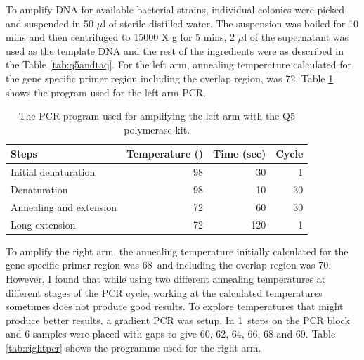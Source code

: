 		To amplify DNA for available bacterial strains, individual colonies were picked and suspended in 50 $ \mu $l of sterile distilled water. The suspension was boiled for 10 mins and then centrifuged to 15000 X g for 5 mins, 2 $ \mu $l of the supernatant was used as the template DNA and the rest of the ingredients were as described in the Table \ref{tab:q5andtaq}. For the left arm, annealing temperature calculated for the gene specific primer region including the overlap region, was 72\textcelsius. Table \ref{tab:leftpcr} shows the program used for the left arm PCR.
		
		\begin{table}[htbp]
		\caption{The PCR program used for amplifying the left arm with the Q5 polymerase kit.}
		\label{tab:leftpcr}
		\begin{center}
		\begin{tabular}{lrrr}
			\toprule[2pt]
			\textbf{Steps}          & \multicolumn{1}{l}{\textbf{Temperature (\textcelsius)}} & \multicolumn{1}{l}{\textbf{Time (sec)}} & \multicolumn{1}{l}{\textbf{Cycle}} \\ \midrule[1pt]
			Initial denaturation    &                                                      98 &                                      30 &                                  1 \\
			Denaturation            &                                                      98 &                                      10 &                                 30 \\
			Annealing and extension &                                                      72 &                                      60 &                                 30 \\
			Long extension          &                                                      72 &                                     120 &                                  1 \\ \bottomrule[2pt]
		\end{tabular}
		\end{center}
		\end{table}
		
		To amplify the right arm, the annealing temperature initially calculated for the gene specific primer region was 68\textcelsius \ and including the overlap region was 70\textcelsius. However, I found that while using two different annealing temperatures at different stages of the PCR cycle, working at the calculated temperatures sometimes does not produce good results. To explore temperatures that might produce better results, a gradient PCR was setup.  In 1\textcelsius \ steps on the PCR block and 6 samples were placed with gaps to give 60, 62, 64, 66, 68 and 69\textcelsius. Table \ref{tab:rightpcr} shows the programme used for the right arm.

